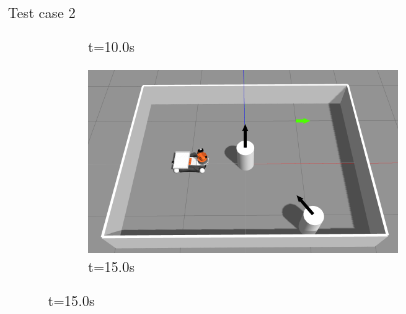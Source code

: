 \documentclass{beamer}
\begin{document}
\begin{frame}[t]{\huge{Test case 2}}
\begin{figure}[H]
\begin{subfigure}[b]{0.50\linewidth}
            \caption{t=10.0s}
        \end{subfigure}%
        \begin{subfigure}[b]{0.50\linewidth}
            \centering
            \includegraphics[width=0.90\textwidth]{../report/images/test_case_2/exp4.png}
            \caption{t=15.0s}
        \end{subfigure}%
    \end{figure}
\end{frame}
\end{document}
